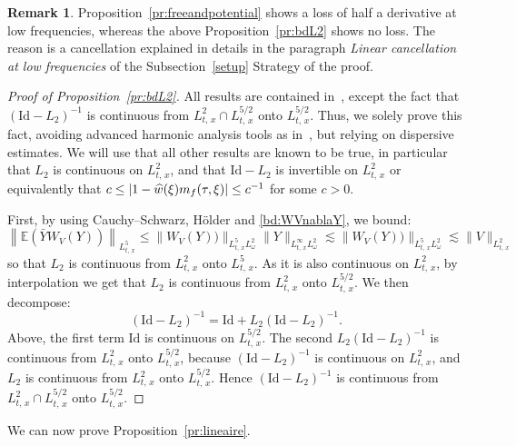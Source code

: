 \documentclass[10pt]{amsart}
\theoremstyle{definition}\newtheorem{defi}[theo]{Definition}\newtheorem{rema}[theo]{Remark}\newtheorem{exam}[theo]{Example}\newtheorem{exem}[theo]{Example}\newtheorem{nota}[theo]{Notation}
\newcommand{\E}{\mathbb{E}}
\newcommand{\Id}{\mathrm{Id}}
\let\oldhat\hat
\renewcommand*{\hat}[1]{\mathchoice{\widehat{#1}}{\widehat{#1}}{\oldhat{#1}}{\oldhat{#1}}}
\begin{document}
\begin{rema}\label{rem:cancellationlineaire}
Proposition~\ref{pr:freeandpotential} shows a loss of half a derivative at low frequencies, whereas the above Proposition~\ref{pr:bdL2} shows no loss. The reason is a cancellation explained in details in the paragraph \emph{Linear cancellation at low frequencies} of the Subsection~\ref{setup} Strategy of the proof.
\end{rema}


\begin{proof}[Proof of Proposition~\ref{pr:bdL2}]
All results are contained in~\cite[Proposition~1 and Corollary~1]{lewsab2}, except the fact that $(\Id-L_2)^{-1}$ is continuous from $L^2_{t,\,x}\cap L^{5/2}_{t,\,x}$ onto $L^{5/2}_{t,\,x}$. Thus, we solely prove this fact, avoiding advanced harmonic analysis tools as in~\cite{lewsab2}, but relying on dispersive estimates. We will use that all other results are known to be true, in particular that $L_2$ is continuous on $L^2_{t,\,x}$, and that $\Id-L_2$ is invertible on $L^2_{t,\,x}$ or equivalently that $c\leq |1-\hat w(\xi)m_f(\tau,\xi)|\leq c^{-1}$ for some $c>0$.

First, by using Cauchy--Schwarz, H\"older and \eqref{bd:WVnablaY}, we bound:
\[
\left\| \E \left(\bar Y W_V (Y)\right) \right\|_{L^5_{t,\,x}}\leq \| W_V (Y)) \|_{L^5_{t,\,x}L^2_\omega} \| Y \|_{L^{\infty}_{t,\,x}L^2_\omega}\lesssim \| W_V (Y)) \|_{L^5_{t,\,x}L^2_\omega} \lesssim \| V \|_{L^2_{t,\,x}}
\]
so that $L_2$ is continuous from $L^2_{t,\,x}$ onto $L^{5}_{t,\,x}$. As it is also continuous on $L^2_{t,\,x}$, by interpolation we get that $L_2$ is continuous from $L^2_{t,\,x}$ onto $L^{5/2}_{t,\,x}$. We then decompose:
\[
(\Id-L_2)^{-1}=\Id+L_2(\Id-L_2)^{-1}.
\]
Above, the first term $\Id$ is continuous on $L^{5/2}_{t,\,x}$. The second $L_2(\Id-L_2)^{-1}$ is continuous from $L^2_{t,\,x}$ onto $L^{5/2}_{t,\,x}$, because $(\Id-L_2)^{-1}$ is continuous on $L^2_{t,\,x}$, and $L_2$ is continuous from $L^2_{t,\,x}$ onto $L^{5/2}_{t,\,x}$. Hence $(\Id-L_2)^{-1}$ is continuous from $L^2_{t,\,x}\cap L^{5/2}_{t,\,x}$ onto $L^{5/2}_{t,\,x}$.
\end{proof}


We can now prove Proposition~\ref{pr:lineaire}.
\end{document}
